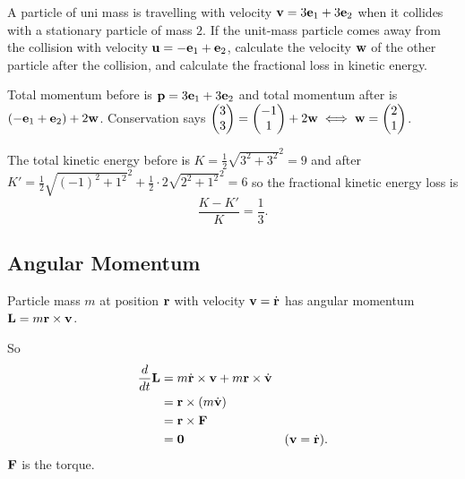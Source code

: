 \documentclass[10pt, a4paper]{article}
\begin{document}
\begin{example}
    A particle of uni mass is travelling with velocity $\mathbf{v} = 3\mathbf{e}_1 + 3\mathbf{e}_2$ when it collides with a stationary particle of mass $2$.
    If the unit-mass particle comes away from the collision with velocity $\mathbf{u} = -\mathbf{e}_1 + \mathbf{e}_2$,
    calculate the velocity $\mathbf{w}$ of the other particle after the collision,
    and calculate the fractional loss in kinetic energy.

    \begin{solution}
        Total momentum before is $\mathbf{p} = 3\mathbf{e}_1 + 3\mathbf{e}_2$ and total momentum after is $(-\mathbf{e}_1 + \mathbf{e}_2) + 2\mathbf{w}$.
        Conservation says
        $\begin{pmatrix}
            3 \\ 3
        \end{pmatrix} = \begin{pmatrix}
            -1 \\ 1
        \end{pmatrix} + 2\mathbf{w} \iff \mathbf{w} = \begin{pmatrix}
            2 \\ 1
        \end{pmatrix}$.

        The total kinetic energy before is $K = \frac{1}{2}\sqrt{3 ^ 2 + 3 ^ 2} ^ 2 = 9$ and after $K' = \frac{1}{2}\sqrt{(-1) ^ 2 + 1 ^ 2} ^ 2 + \frac{1}{2}\cdot 2\sqrt{2 ^ 2 + 1 ^ 2} ^ 2 = 6$ so the fractional kinetic energy loss is
        \[
        \frac{K - K'}{K} = \frac{1}{3}.
        \]
    \end{solution}
\end{example}

\subsection{Angular Momentum}
\begin{definition}
    Particle mass $m$ at position $\mathbf{r}$ with velocity $\mathbf{v} = \dot{\mathbf{r}}$ has angular momentum $\mathbf{L} = m\mathbf{r} \times \mathbf{v}$.
\end{definition}

So
\begin{align*}
    \frac{d}{dt}\mathbf{L} &= m\dot{\mathbf{r}} \times \mathbf{v} + m\mathbf{r} \times \dot{\mathbf{v}} \\
    &= \mathbf{r} \times (m\dot{\mathbf{v}}) \\
    &= \mathbf{r} \times \mathbf{F} \\
    &= \mathbf{0} &(\mathbf{v} = \dot{\mathbf{r}}).
\end{align*}
$\mathbf{F}$ is the torque.
\end{document}
